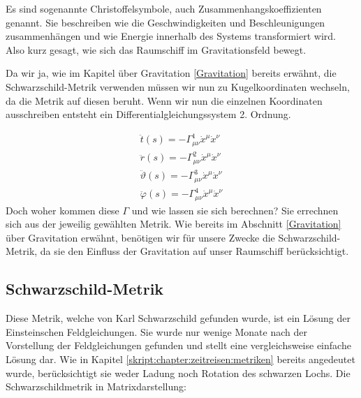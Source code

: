 \begin{refsection}
	Es sind sogenannte Christoffelsymbole, auch Zusammenhangskoeffizienten genannt. Sie beschreiben wie die Geschwindigkeiten und Beschleunigungen zusammenhängen und wie Energie innerhalb des Systems transformiert wird. Also kurz gesagt, wie sich das Raumschiff im Gravitationsfeld bewegt.
	
	 
	Da wir ja, wie im Kapitel über Gravitation \ref{Gravitation} bereits erwähnt, die Schwarzschild-Metrik verwenden müssen wir nun zu Kugelkoordinaten wechseln, da die Metrik auf diesen beruht. Wenn wir nun die einzelnen Koordinaten ausschreiben entsteht ein Differentialgleichungssystem 2. Ordnung.
	
	\begin{equation}\label{skript:chapter:zeitreisen:geodaeten4dim}
	\begin{aligned}
	\ddot{t}(s) = -\Gamma^{1}_{\mu\nu}\dot{x}^{\mu}\dot{x}^{\nu}\\
	\ddot{r}(s) = -\Gamma^{2}_{\mu\nu}\dot{x}^{\mu}\dot{x}^{\nu}\\
	\ddot{\vartheta}(s) = -\Gamma^{3}_{\mu\nu}\dot{x}^{\mu}\dot{x}^{\nu}\\
	\ddot{\varphi}(s) = -\Gamma^{4}_{\mu\nu}\dot{x}^{\mu}\dot{x}^{\nu}	
	\end{aligned}
	\end{equation}
	Doch woher kommen diese $\Gamma$ und wie lassen sie sich berechnen?
	Sie errechnen sich aus der jeweilig gewählten Metrik. 
	Wie bereits im Abschnitt \ref{Gravitation} über Gravitation erwähnt, benötigen wir für unsere Zwecke die Schwarzschild-Metrik, da sie den Einfluss der Gravitation auf unser Raumschiff berücksichtigt. 

	\subsection{Schwarzschild-Metrik}\label{Schwarzschild-Metrik}
	
	Diese Metrik, welche von Karl Schwarzschild gefunden wurde, ist ein Lösung der Einsteinschen Feldgleichungen. Sie wurde nur wenige Monate nach der Vorstellung der Feldgleichungen gefunden und stellt eine vergleichsweise einfache Lösung dar. Wie in Kapitel \ref{skript:chapter:zeitreisen:metriken} bereits angedeutet wurde, berücksichtigt sie weder Ladung noch Rotation des schwarzen Lochs. 
	Die Schwarzschildmetrik in Matrixdarstellung:
	

\end{refsection}
